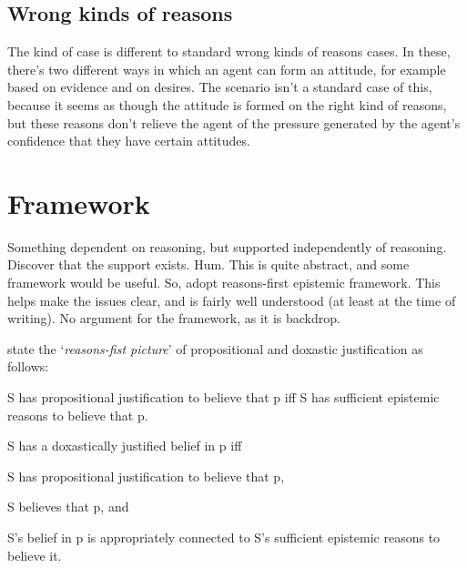 \documentclass[10pt]{article}
\begin{document}
\subsection{Wrong kinds of reasons}
\label{sec:wrong-kinds-reasons}

The kind of case is different to standard wrong kinds of reasons cases.
In these, there's two different ways in which an agent can form an attitude, for example based on evidence and on desires.
The scenario isn't a standard case of this, because it seems as though the attitude is formed on the right kind of reasons, but these reasons don't relieve the agent of the pressure generated by the agent's confidence that they have certain attitudes.

\section{Framework}
\label{sec:framework}

\begin{note}
  Something dependent on reasoning, but supported independently of reasoning.
  Discover that the support exists.
  Hum.
  This is quite abstract, and some framework would be useful.
  So, adopt reasons-first epistemic framework.
  This helps make the issues clear, and is fairly well understood (at least at the time of writing).
  No argument for the framework, as it is backdrop.
\end{note}

\textcite{Silva:2020aa} state the `\emph{reasons-fist picture}' of propositional and doxastic justification as follows:

\begin{description}[font=\bfseries, leftmargin=.75cm, style=nextline]
\item[Propositional Justification (PJ):] S has propositional justification to believe that p iff S has sufficient epistemic reasons to believe that p.
\item[Doxastic Justification (DJ):] S has a doxastically justified belief in p iff
  \begin{enumerate*}[label=(\roman*)]
  \item S has propositional justification to believe that p,
  \item S believes that p, and
  \item S's belief in p is appropriately connected to S's sufficient epistemic reasons to believe it.
  \end{enumerate*}
\end{description}
\end{document}

